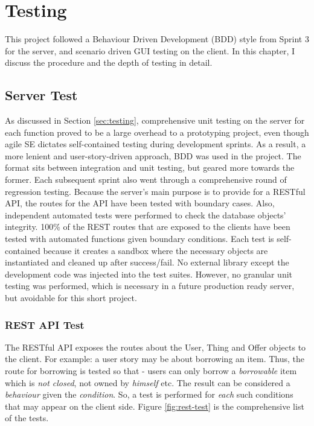 \chapter{Testing}
\label{chap:test}

This project followed a Behaviour Driven Development (BDD) style from Sprint 3 for the server, and scenario driven GUI testing on the client. In this chapter, I discuss the procedure and the depth of testing in detail.

\section{Server Test}

As discussed in Section \ref{sec:testing}, comprehensive unit testing on the server for each function proved to be a large overhead to a prototyping project, even though agile SE dictates self-contained testing during development sprints. As a result, a more lenient and user-story-driven approach, BDD was used in the project. The format sits between integration and unit testing, but geared more towards the former. Each subsequent sprint also went through a comprehensive round of regression testing. Because the server's main purpose is to provide for a RESTful API, the routes for the API have been tested with boundary cases. Also, independent automated tests were performed to check the database objects' integrity. 100\% of the REST routes that are exposed to the clients have been tested with automated functions given boundary conditions. Each test is self-contained because it creates a sandbox where the  necessary objects are instantiated and cleaned up after success/fail. No external library except the development code was injected into the test suites. However, no granular unit testing was performed, which is necessary in a future production ready server, but avoidable for this short project.

\subsection{REST API Test}

The RESTful API exposes the routes about the User, Thing and Offer objects to the client. For example: a user story may be about borrowing an item. Thus, the route for borrowing is tested so that - users can only borrow a \textit{borrowable} item which is \textit{not closed}, not owned by \textit{himself} etc. The result can be considered a \textit{behaviour} given the \textit{condition}. So, a test is performed for \textit{each} such conditions that may appear on the client side. Figure \ref{fig:rest-test} is the comprehensive list of the tests.\\

